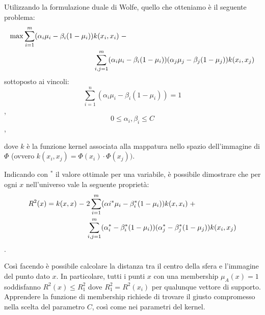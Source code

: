 \documentclass[a4paper,12pt]{report}
\begin{document}
Utilizzando la formulazione duale di Wolfe, quello che otteniamo è il seguente problema:
\begin{equation}
\begin{split}
    \max \displaystyle\sum_{i=1}^{m}(\alpha_i\mu_i - \beta_i(1-\mu_i))&k(x_i,x_i)\hspace{0,1cm}- \\ &\displaystyle\sum_{i,j=1}^{m}(\alpha_i\mu_i - \beta_i(1-\mu_i))(\alpha_j\mu_j - \beta_j(1-\mu_j))k(x_i,x_j)
\end{split}
\label{eq:problema_finale}
\end{equation}
sottoposto ai vincoli:
\begin{equation}
    \displaystyle\sum_{i=1}^{n}(\alpha_i\mu_i - \beta_i(1-\mu_i)) = 1
    \label{eq:v1_problema_finale}
\end{equation},
\begin{equation}
    0 \le \alpha_i,\beta_i \le C
    \label{eq:v2_problema_finale}
\end{equation},

\noindent dove $k$ è la funzione kernel associata alla mappatura nello spazio dell'immagine di $\Phi$ (ovvero $k(x_i,x_j) = \Phi(x_i)\cdot\Phi(x_j))$.

Indicando con $^*$ il valore ottimale per una variabile, è possibile dimostrare che per ogni $x$ nell'universo vale la seguente proprietà:
\begin{equation*}
\begin{split}
    R^{2}(x) = k(x,x) \hspace{0,1cm}- \hspace{0,1cm}&2\displaystyle\sum_{i=1}^{m}(\alpha{i}^{*}\mu_{i} - \beta_{i}^{*}(1-\mu_{i}))k(x,x_i)\hspace{0,1cm} + \\ 
    &\displaystyle\sum_{i,j=1}^{m}(\alpha_{i}^{*} - \beta_{i}^{*}(1-\mu_{i}))(\alpha_{j}^{*} - \beta_{j}^{*}(1-\mu_{j}))k(x_i,x_j)
\end{split}
\end{equation*}.

\noindent Così facendo è possibile calcolare la distanza tra il centro della sfera e l'immagine del punto dato $x$.
In particolare, tutti i punti $x$ con una membership $\mu_{A}(x) = 1$ soddisfanno $R^2(x) \le R^2_1$ dove $R^2_1 = R^2(x_i)$ per qualunque vettore di supporto.
Apprendere la funzione di membership richiede di trovare il giusto compromesso nella scelta del parametro $C$, così come nei parametri del kernel.
\end{document}
